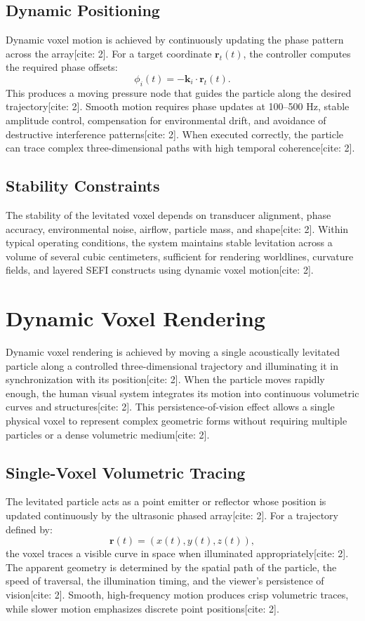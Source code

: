\documentclass[10pt,twocolumn]{article}
\begin{document}
\subsection{Dynamic Positioning}
Dynamic voxel motion is achieved by continuously updating the phase pattern across the array[cite: 2]. For a target coordinate $\mathbf{r}_{t}(t)$, the controller computes the required phase offsets:
\begin{equation}
\phi_{i}(t) = -\mathbf{k}_{i} \cdot \mathbf{r}_{t}(t).
\end{equation}
This produces a moving pressure node that guides the particle along the desired trajectory[cite: 2]. Smooth motion requires phase updates at 100--500 Hz, stable amplitude control, compensation for environmental drift, and avoidance of destructive interference patterns[cite: 2]. When executed correctly, the particle can trace complex three-dimensional paths with high temporal coherence[cite: 2].

\subsection{Stability Constraints}
The stability of the levitated voxel depends on transducer alignment, phase accuracy, environmental noise, airflow, particle mass, and shape[cite: 2]. Within typical operating conditions, the system maintains stable levitation across a volume of several cubic centimeters, sufficient for rendering worldlines, curvature fields, and layered SEFI constructs using dynamic voxel motion[cite: 2].
\section{Dynamic Voxel Rendering}
Dynamic voxel rendering is achieved by moving a single acoustically levitated particle along a controlled three-dimensional trajectory and illuminating it in synchronization with its position[cite: 2]. When the particle moves rapidly enough, the human visual system integrates its motion into continuous volumetric curves and structures[cite: 2]. This persistence-of-vision effect allows a single physical voxel to represent complex geometric forms without requiring multiple particles or a dense volumetric medium[cite: 2].

\subsection{Single-Voxel Volumetric Tracing}
The levitated particle acts as a point emitter or reflector whose position is updated continuously by the ultrasonic phased array[cite: 2]. For a trajectory defined by:
\begin{equation}
\mathbf{r}(t) = (x(t), y(t), z(t)),
\end{equation}
the voxel traces a visible curve in space when illuminated appropriately[cite: 2]. The apparent geometry is determined by the spatial path of the particle, the speed of traversal, the illumination timing, and the viewer's persistence of vision[cite: 2]. Smooth, high-frequency motion produces crisp volumetric traces, while slower motion emphasizes discrete point positions[cite: 2].
\end{document}
